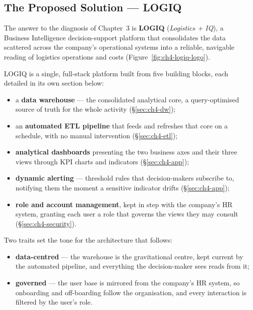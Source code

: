 \subsection{The Proposed Solution --- LOGIQ}
\label{subsec:ch4-logiq}

The answer to the diagnosis of Chapter~3 is \textbf{LOGIQ} (\emph{Logistics + IQ}), a Business
Intelligence decision-support platform that consolidates the data scattered across the company's
operational systems into a reliable, navigable reading of logistics operations and costs
(Figure~\ref{fig:ch4-logiq-logo}).


LOGIQ is a single, full-stack platform built from five building blocks, each detailed in its own
section below:

\begin{itemize}[noitemsep]
    \item a \textbf{data warehouse} --- the consolidated analytical core, a query-optimised source of
          truth for the whole activity (\S\ref{sec:ch4-dw});
    \item an \textbf{automated ETL pipeline} that feeds and refreshes that core on a schedule, with no
          manual intervention (\S\ref{sec:ch4-etl});
    \item \textbf{analytical dashboards} presenting the two business axes and their three views through
          KPI charts and indicators (\S\ref{sec:ch4-app});
    \item \textbf{dynamic alerting} --- threshold rules that decision-makers subscribe to, notifying
          them the moment a sensitive indicator drifts (\S\ref{sec:ch4-app});
    \item \textbf{role and account management}, kept in step with the company's HR system, granting each
          user a role that governs the views they may consult (\S\ref{sec:ch4-security}).
\end{itemize}

Two traits set the tone for the architecture that follows:

\begin{itemize}[noitemsep]
    \item \textbf{data-centred} --- the warehouse is the gravitational centre, kept current by the
          automated pipeline, and everything the decision-maker sees reads from it;
    \item \textbf{governed} --- the user base is mirrored from the company's HR system, so onboarding and
          off-boarding follow the organisation, and every interaction is filtered by the user's role.
\end{itemize}

